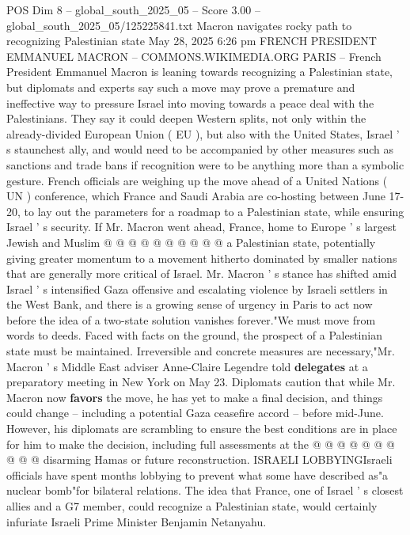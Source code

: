 \begin{textsample}{POS Dim 8 – global\_south\_2025\_05 – Score 3.00 – global\_south\_2025\_05/125225841.txt}  \label{ex:f8_pos_444}
Macron navigates rocky path to recognizing Palestinian state May 28, 2025 6:26 pm FRENCH PRESIDENT EMMANUEL MACRON -- COMMONS.WIKIMEDIA.ORG PARIS -- French President Emmanuel Macron is leaning towards recognizing a Palestinian state, but diplomats and experts say such a move may prove a premature and ineffective way to pressure Israel into moving towards a peace deal with the Palestinians.
They say it could deepen Western splits, not only within the already-divided European Union ( EU ), but also with the United States, Israel ' s staunchest ally, and would need to be accompanied by other measures such as sanctions and trade bans if recognition were to be anything more than a symbolic gesture.
French officials are weighing up the move ahead of a United Nations ( UN ) conference, which France and Saudi Arabia are co-hosting between June 17-20, to lay out the parameters for a roadmap to a Palestinian state, while ensuring Israel ' s security.
If Mr.
Macron went ahead, France, home to Europe ' s largest Jewish and Muslim @ @ @ @ @ @ @ @ @ @ a Palestinian state, potentially giving greater momentum to a movement hitherto dominated by smaller nations that are generally more critical of Israel.
Mr.
Macron ' s stance has shifted amid Israel ' s intensified Gaza offensive and escalating violence by Israeli settlers in the West Bank, and there is a growing sense of urgency in Paris to act now before the idea of a two-state solution vanishes forever."We must move from words to deeds.
Faced with facts on the ground, the prospect of a Palestinian state must be maintained.
Irreversible and concrete measures are necessary,"Mr.
Macron ' s Middle East adviser Anne-Claire Legendre told \textbf{delegates} at a preparatory meeting in New York on May 23.
Diplomats caution that while Mr.
Macron now \textbf{favors} the move, he has yet to make a final decision, and things could change -- including a potential Gaza ceasefire accord -- before mid-June.
However, his diplomats are scrambling to ensure the best conditions are in place for him to make the decision, including full assessments at the @ @ @ @ @ @ @ @ @ @ disarming Hamas or future reconstruction.
ISRAELI LOBBYINGIsraeli officials have spent months lobbying to prevent what some have described as"a nuclear bomb"for bilateral relations.
The idea that France, one of Israel ' s closest allies and a G7 member, could recognize a Palestinian state, would certainly infuriate Israeli Prime Minister Benjamin Netanyahu.

\end{textsample}
